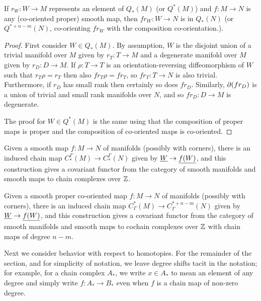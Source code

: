 \begin{lemma}\label{L: Q preservation}
	If $r_W \colon W \to M$ represents an element of $Q_*(M)$ (or $Q^*(M)$) and $f \colon M \to N$ is any (co-oriented proper) smooth map, then $fr_W \colon W \to N$ is in $Q_*(N)$ (or $Q^{*+n-m}(N)$, co-orienting $fr_W$ with the composition co-orientation.).
\end{lemma}

\begin{proof}
	First consider $W \in Q_*(M)$.
	By assumption, $W$ is the disjoint union of a trivial manifold over $M$ given by $r_T \colon T \to M$ and a degenerate manifold over $M$ given by $r_D:D \to M$.
	If $\rho \colon T \to T$ is an orientation-reversing diffeomorphism of $W$ such that $r_T\rho = r_T$ then also $fr_T\rho = fr_T$, so $fr_T \colon T \to N$ is also trivial.
	Furthermore, if $r_D$ has small rank then certainly so does $fr_D$.
	Similarly, $\partial(fr_D)$ is a union of trivial and small rank manifolds over $N$, and so $fr_D:D \to M$ is degenerate.

	The proof for $W \in Q^*(M)$ is the same using that the composition of proper maps is proper and the composition of co-oriented maps is co-oriented.
\end{proof}

\begin{corollary}\label{C: homology chain map}
	Given a smooth map $f \colon M \to N$ of manifolds (possibly with corners), there is an induced chain map $C_*^\Gamma(M) \to C_*^\Gamma(N)$ given by $\underline{W} \to \underline{f(W)}$, and this construction gives a covariant functor from the category of smooth manifolds and smooth maps to chain complexes over $\mathbb{Z}$.
\end{corollary}

\begin{corollary}
	Given a smooth proper co-oriented map $f \colon M \to N$ of manifolds (possibly with corners), there is an induced chain map $C^*_\Gamma(M) \to C^{*+n-m}_\Gamma(N)$ given by $\underline{W} \to \underline{f(W)}$, and this construction gives a covariant functor from the category of smooth manifolds and smooth maps to cochain complexes over $\mathbb{Z}$ with chain maps of degree $n-m$.
\end{corollary}

Next we consider behavior with respect to homotopies.
For the remainder of the section, and for simplicity of notation, we leave degree shifts tacit in the notation; for example, for a chain complex $A_*$, we write $x \in A_*$ to mean an element of any degree and simply write $f \colon A_* \to B_*$ even when $f$ is a chain map of non-zero degree.

